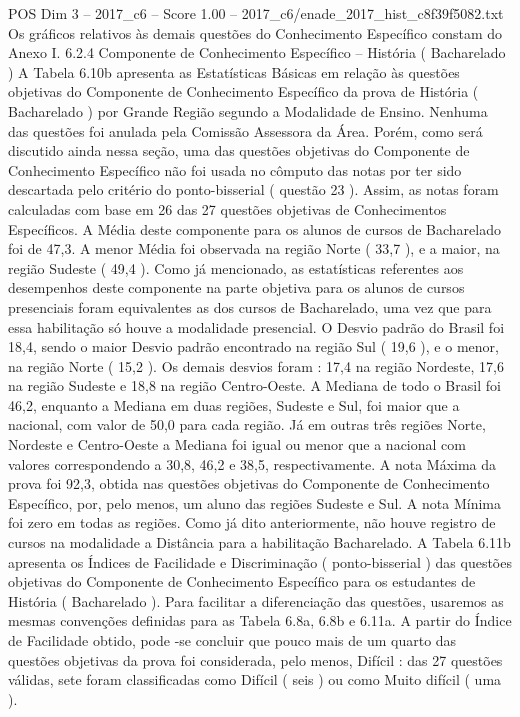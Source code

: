 \begin{textsample}{POS Dim 3 – 2017\_c6 – Score 1.00 – 2017\_c6/enade\_2017\_hist\_c8f39f5082.txt}
Os gráficos relativos às demais questões do Conhecimento Específico constam do Anexo I. 6.2.4 Componente de Conhecimento Específico – História ( Bacharelado ) A Tabela 6.10b apresenta as Estatísticas Básicas em relação às questões objetivas do Componente de Conhecimento Específico da prova de História ( Bacharelado ) por Grande Região segundo a Modalidade de Ensino.
Nenhuma das questões foi anulada pela Comissão Assessora da Área.
Porém, como será discutido ainda nessa seção, uma das questões objetivas do Componente de Conhecimento Específico não foi usada no cômputo das notas por ter sido descartada pelo critério do ponto-bisserial ( questão 23 ).
Assim, as notas foram calculadas com base em 26 das 27 questões objetivas de Conhecimentos Específicos.
A Média deste componente para os alunos de cursos de Bacharelado foi de 47,3.
A menor Média foi observada na região Norte ( 33,7 ), e a maior, na região Sudeste ( 49,4 ).
Como já mencionado, as estatísticas referentes aos desempenhos deste componente na parte objetiva para os alunos de cursos presenciais foram equivalentes as dos cursos de Bacharelado, uma vez que para essa habilitação só houve a modalidade presencial.
O Desvio padrão do Brasil foi 18,4, sendo o maior Desvio padrão encontrado na região Sul ( 19,6 ), e o menor, na região Norte ( 15,2 ).
Os demais desvios foram : 17,4 na região Nordeste, 17,6 na região Sudeste e 18,8 na região Centro-Oeste.
A Mediana de todo o Brasil foi 46,2, enquanto a Mediana em duas regiões, Sudeste e Sul, foi maior que a nacional, com valor de 50,0 para cada região.
Já em outras três regiões Norte, Nordeste e Centro-Oeste a Mediana foi igual ou menor que a nacional com valores correspondendo a 30,8, 46,2 e 38,5, respectivamente.
A nota Máxima da prova foi 92,3, obtida nas questões objetivas do Componente de Conhecimento Específico, por, pelo menos, um aluno das regiões Sudeste e Sul.
A nota Mínima foi zero em todas as regiões.
Como já dito anteriormente, não houve registro de cursos na modalidade a Distância para a habilitação Bacharelado.
A Tabela 6.11b apresenta os Índices de Facilidade e Discriminação ( ponto-bisserial ) das questões objetivas do Componente de Conhecimento Específico para os estudantes de História ( Bacharelado ).
Para facilitar a diferenciação das questões, usaremos as mesmas convenções definidas para as Tabela 6.8a, 6.8b e 6.11a.
A partir do Índice de Facilidade obtido, pode -se concluir que pouco mais de um quarto das questões objetivas da prova foi considerada, pelo menos, Difícil : das 27 questões válidas, sete foram classificadas como Difícil ( seis ) ou como Muito difícil ( uma ).

\end{textsample}
